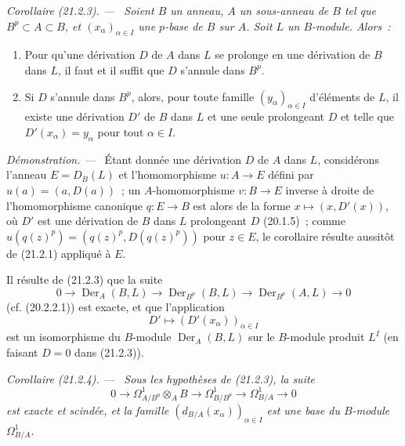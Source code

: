 \documentclass[10pt,oneside]{book}
\makeatletter
\newcommand{\setmanualcurrentlabel}[1]{\def\@currentlabel{#1}}
\newenvironment{corollary}[1][]{%
  \setmanualcurrentlabel{#1}\par\medskip\noindent\itshape Corollaire (#1). ---\ }{\par}
\newenvironment{proof}{%
  \par\medskip\noindent\textit{Démonstration. ---\ }}{\par}
\makeatother
\begin{document}
\begin{corollary}[21.2.3]
\label{0.21.2.3-fr}
Soient $B$ un anneau, $A$ un sous-anneau de $B$ tel que $B^p\subset A\subset B$,
et $\left(x_\alpha\right)_{\alpha\in I}$ une $p$-base de $B$ sur $A$. Soit
$L$ un $B$-module. Alors~:
\begin{enumerate}
  \item[(i)] Pour qu'une dérivation $D$ de $A$ dans $L$ se prolonge en une
  dérivation de $B$ dans $L$, il faut et il suffit que $D$ s'annule dans $B^p$.
  \item[(ii)] Si $D$ s'annule dans $B^p$, alors, pour toute famille
  $(y_\alpha)_{\alpha\in I}$ d'éléments de $L$, il existe une dérivation
  $D'$ de $B$ dans $L$ et une seule prolongeant $D$ et telle que
  $D'(x_\alpha)=y_\alpha$ pour tout $\alpha\in I$.
\end{enumerate}
\end{corollary}

\begin{proof}
Étant donnée une dérivation $D$ de $A$ dans $L$, considérons l'anneau
$E=D_B(L)$ et l'homomorphisme $u:A\to E$ défini par $u(a)=(a,D(a))$~; un
$A$-homomorphisme $v:B\to E$ inverse à droite de l'homomorphisme canonique
$q:E\to B$ est alors de la forme $x\mapsto(x,D'(x))$, où $D'$ est une
dérivation de $B$ dans $L$ prolongeant $D$ (20.1.5)~; comme
$u(q(z)^p)=(q(z)^p,D(q(z)^p))$ pour $z\in E$, le corollaire résulte aussitôt
de (21.2.1) appliqué à $E$.
\end{proof}

Il résulte de (21.2.3) que la suite
\begin{equation}
\tag{21.2.3.1}
\label{0.21.2.3.1-fr}
0\to\operatorname{Der}_A(B,L)\to\operatorname{Der}_{B^p}(B,L)
\to\operatorname{Der}_{B^p}(A,L)\to0
\end{equation}
(cf. (20.2.2.1)) est exacte, et que l'application
\begin{equation}
\tag{21.2.3.2}
\label{0.21.2.3.2-fr}
D'\longmapsto(D'(x_\alpha))_{\alpha\in I}
\end{equation}
est un isomorphisme du $B$-module $\operatorname{Der}_A(B,L)$ sur le
$B$-module produit $L^I$ (en faisant $D=0$ dans (21.2.3)).

\begin{corollary}[21.2.4]
\label{0.21.2.4-fr}
Sous les hypothèses de (21.2.3), la suite
\begin{equation}
\tag{21.2.4.1}
\label{0.21.2.4.1-fr}
0\to\Omega^1_{A/B^p}\otimes_A B\to\Omega^1_{B/B^p}
\to\Omega^1_{B/A}\to0
\end{equation}
est exacte et scindée, et la famille $(d_{B/A}(x_\alpha))_{\alpha\in I}$ est
une base du $B$-module $\Omega^1_{B/A}$.
\end{corollary}
\end{document}
